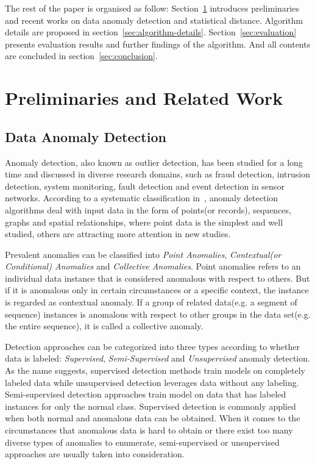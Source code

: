 \documentclass[a4paper]{IEEEtran}
\begin{document}
		The rest of the paper is organised as follow: Section~\ref{sec:related-work} introduces preliminaries and recent works on data anomaly detection and statistical distance. Algorithm details are proposed in section~\ref{sec:algorithm-details}. Section~\ref{sec:evaluation} presents evaluation results and further findings of the algorithm. And all contents are concluded in section~\ref{sec:conclusion}.
	
	\section{Preliminaries and Related Work}\label{sec:related-work}
		\subsection{Data Anomaly Detection}
			Anomaly detection, also known as outlier detection, has been studied for a long time and discussed in diverse research domains, such as fraud detection, intrusion detection, system monitoring, fault detection and event detection in sensor networks. According to a systematic classification in~\cite{chandola2009anomaly}, anomaly detection algorithms deal with input data in the form of points(or records), sequences, graphs and spatial relationships, where point data is the simplest and well studied, others are attracting more attention in new studies.
			
			Prevalent anomalies can be classified into \textit{Point Anomalies}, \textit{Contextual(or Conditional) Anomalies} and \textit{Collective Anomalies}. Point anomalies refers to an individual data instance that is considered anomalous with respect to others. But if it is anomalous only in certain circumstances or a specific context, the instance is regarded as contextual anomaly. If a group of related data(e.g. a segment of sequence) instances is anomalous with respect to other groups in the data set(e.g. the entire sequence), it is called a collective anomaly.
			
			Detection approaches can be categorized into three types according to whether data is labeled: \textit{Supervised}, \textit{Semi-Supervised} and \textit{Unsupervised} anomaly detection. As the name suggests, supervised detection methods train models on completely labeled data while unsupervised detection leverages data without any labeling. Semi-supervised detection approaches train model on data that has labeled instances for only the normal class. Supervised detection is commonly applied when both normal and anomalous data can be obtained. When it comes to the circumstances that anomalous data is hard to obtain or there exist too many diverse types of anomalies to enumerate, semi-supervised or unsupervised approaches are usually taken into consideration.
			
\end{document}
